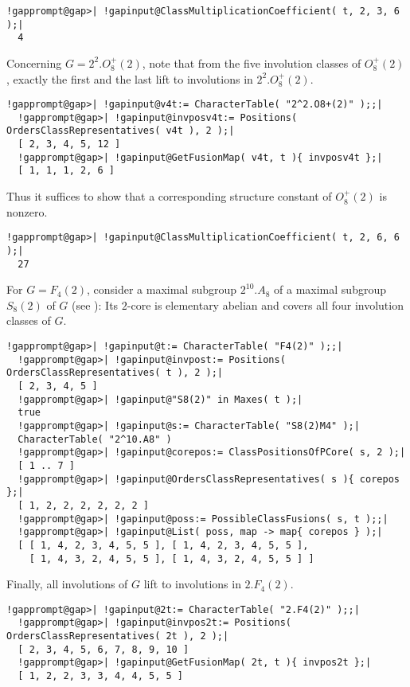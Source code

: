 \documentclass[a4paper,11pt]{report}
\begin{document}
{{{ 
\begin{Verbatim}[commandchars=!@|,fontsize=\small,frame=single,label=Example]
  !gapprompt@gap>| !gapinput@ClassMultiplicationCoefficient( t, 2, 3, 6 );|
  4
\end{Verbatim}
 

 Concerning $G = 2^2.O_8^+(2)$, note that from the five involution classes of $O_8^+(2)$, exactly the first and the last lift to involutions in $2^2.O_8^+(2)$. 

 
\begin{Verbatim}[commandchars=!@|,fontsize=\small,frame=single,label=Example]
  !gapprompt@gap>| !gapinput@v4t:= CharacterTable( "2^2.O8+(2)" );;|
  !gapprompt@gap>| !gapinput@invposv4t:= Positions( OrdersClassRepresentatives( v4t ), 2 );|
  [ 2, 3, 4, 5, 12 ]
  !gapprompt@gap>| !gapinput@GetFusionMap( v4t, t ){ invposv4t };|
  [ 1, 1, 1, 2, 6 ]
\end{Verbatim}
 

 Thus it suffices to show that a corresponding structure constant of $O_8^+(2)$ is nonzero. 

 
\begin{Verbatim}[commandchars=!@|,fontsize=\small,frame=single,label=Example]
  !gapprompt@gap>| !gapinput@ClassMultiplicationCoefficient( t, 2, 6, 6 );|
  27
\end{Verbatim}
 

 For $G = F_4(2)$, consider a maximal subgroup $2^{10}.A_8$ of a maximal subgroup $S_8(2)$ of $G$ (see \cite[p.{\nobreakspace}123 and 170]{CCN85}): Its $2$-core is elementary abelian and covers all four involution classes of $G$. 

 
\begin{Verbatim}[commandchars=!@|,fontsize=\small,frame=single,label=Example]
  !gapprompt@gap>| !gapinput@t:= CharacterTable( "F4(2)" );;|
  !gapprompt@gap>| !gapinput@invpost:= Positions( OrdersClassRepresentatives( t ), 2 );|
  [ 2, 3, 4, 5 ]
  !gapprompt@gap>| !gapinput@"S8(2)" in Maxes( t );|
  true
  !gapprompt@gap>| !gapinput@s:= CharacterTable( "S8(2)M4" );|
  CharacterTable( "2^10.A8" )
  !gapprompt@gap>| !gapinput@corepos:= ClassPositionsOfPCore( s, 2 );|
  [ 1 .. 7 ]
  !gapprompt@gap>| !gapinput@OrdersClassRepresentatives( s ){ corepos };|
  [ 1, 2, 2, 2, 2, 2, 2 ]
  !gapprompt@gap>| !gapinput@poss:= PossibleClassFusions( s, t );;|
  !gapprompt@gap>| !gapinput@List( poss, map -> map{ corepos } );|
  [ [ 1, 4, 2, 3, 4, 5, 5 ], [ 1, 4, 2, 3, 4, 5, 5 ], 
    [ 1, 4, 3, 2, 4, 5, 5 ], [ 1, 4, 3, 2, 4, 5, 5 ] ]
\end{Verbatim}
 

 Finally, all involutions of $G$ lift to involutions in $2.F_4(2)$. 

 
\begin{Verbatim}[commandchars=!@|,fontsize=\small,frame=single,label=Example]
  !gapprompt@gap>| !gapinput@2t:= CharacterTable( "2.F4(2)" );;|
  !gapprompt@gap>| !gapinput@invpos2t:= Positions( OrdersClassRepresentatives( 2t ), 2 );|
  [ 2, 3, 4, 5, 6, 7, 8, 9, 10 ]
  !gapprompt@gap>| !gapinput@GetFusionMap( 2t, t ){ invpos2t };|
  [ 1, 2, 2, 3, 3, 4, 4, 5, 5 ]
\end{Verbatim}
 }

 }

 }
\end{document}
